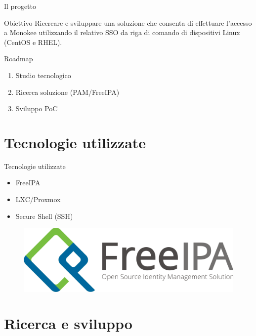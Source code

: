 \documentclass{beamer}
\begin{document}
	\begin{frame}{Il progetto}
		\begin{block}{Obiettivo}
			Ricercare e sviluppare una soluzione che consenta di effettuare l'accesso a Monokee utilizzando il relativo SSO da riga di comando di dispositivi Linux (CentOS e RHEL).
		\end{block}
	\end{frame}
	
	\begin{frame}{Roadmap}
				
		\begin{enumerate}
			\item Studio tecnologico \vspace{.5em}
			\item Ricerca soluzione (PAM/FreeIPA) \vspace{.5em}
			\item Sviluppo PoC \vspace{.5em}
		\end{enumerate}
		
	\end{frame}
	
	\section{Tecnologie utilizzate}
	
	\begin{frame}{Tecnologie utilizzate}
		
		\begin{itemize}
			\item FreeIPA \vspace{.5em}
			\item LXC/Proxmox \vspace{.5em}
			\item Secure Shell (SSH) \vspace{.5em}
		\end{itemize}
		
		\begin{figure}[H] 
			\centering 
			\includegraphics[width=0.4\columnwidth]{immagini/logo-freeipa.png} 
			\label{fig:freeipa}
		\end{figure}
	\end{frame}
	
	\section{Ricerca e sviluppo}
	
\end{document}
